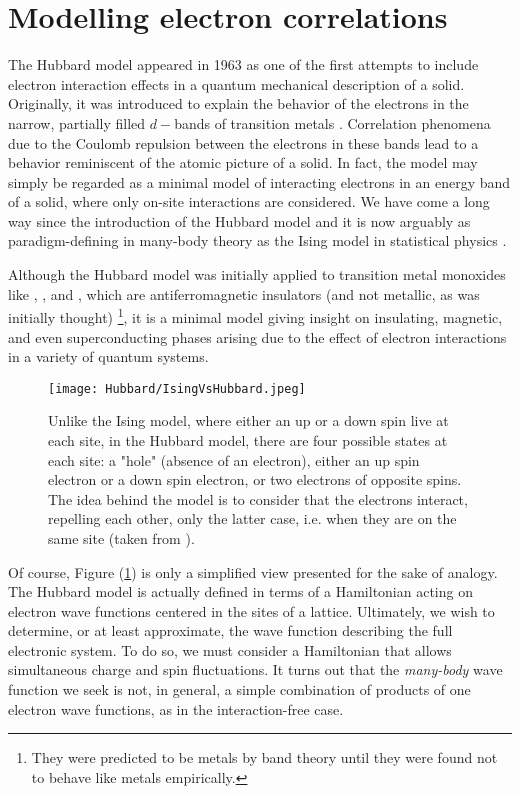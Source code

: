 \section{Modelling electron correlations}\label{sec:intro}

The Hubbard model appeared in 1963 as one of the first attempts to include electron interaction effects in a quantum mechanical description of a solid.
Originally, it was introduced to explain the behavior of the electrons in the narrow, partially filled $d-$bands of transition metals \cite{hubbard_electron_1963}.
Correlation phenomena due to the Coulomb repulsion between the electrons in these bands lead to a behavior reminiscent of the atomic picture of a solid.
In fact, the model may simply be regarded as a minimal model of interacting electrons in an energy band of a solid, where only on-site interactions are considered.
We have come a long way since the introduction of the Hubbard model and it is now arguably as paradigm-defining in many-body theory as the Ising model in statistical physics \cite{fazekas_lecture_1999, mahan_many-particle_2000, altland_condensed_2010}.

Although the Hubbard model was initially applied to transition metal monoxides like , , and , which are antiferromagnetic insulators (and not metallic, as was initially thought) \footnote{They were predicted to be metals by band theory until they were found not to behave like metals empirically.}, it is a minimal model giving insight on insulating, magnetic, and even superconducting phases arising due to the effect of electron interactions in a variety of quantum systems.

\begin{figure}[H]
	\centering
\texttt{[image: Hubbard/IsingVsHubbard.jpeg]}
	\caption[Graphical comparison between the Ising and the Hubbard models.]{Unlike the Ising model, where either an up or a down spin live at each site, in the Hubbard model, there are four possible states at each site: a "hole" (absence of an electron), either an up spin electron or a down spin electron, or two electrons of opposite spins.
	The idea behind the model is to consider that the electrons interact, repelling each other, only the latter case, i.e. when they are on the same site (taken from \cite{hayes_hip-hop_2009}).}
	\label{fig:IsingVsHubbard}
\end{figure}

Of course, Figure (\ref{fig:IsingVsHubbard}) is only a simplified view presented for the sake of analogy.
The Hubbard model is actually defined in terms of a Hamiltonian acting on electron wave functions centered in the sites of a lattice.
Ultimately, we wish to determine, or at least approximate, the wave function describing the full electronic system.
To do so, we must consider a Hamiltonian that allows simultaneous charge and spin fluctuations.
It turns out that the \emph{many-body} wave function we seek is not, in general, a simple combination of products of one electron wave functions, as in the interaction-free case.

